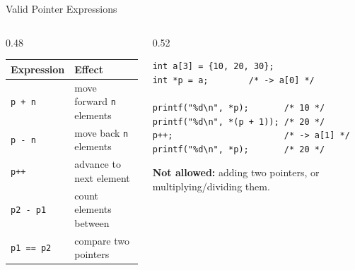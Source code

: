 \documentclass[aspectratio=169]{beamer}
\begin{document}
	\begin{frame}[fragile]{Valid Pointer Expressions}
		\begin{columns}[T]
			\begin{column}{0.48\textwidth}
				\renewcommand{\arraystretch}{1.25}
				\centering
				\begin{tabular}{@{}ll@{}}
					\toprule
					\textbf{Expression} & \textbf{Effect} \\
					\midrule
					\texttt{p + n} & move forward \texttt{n} elements \\
					\texttt{p - n} & move back \texttt{n} elements \\
					\texttt{p++}   & advance to next element \\
					\texttt{p2 - p1} & count elements between \\
					\texttt{p1 == p2} & compare two pointers \\
					\bottomrule
				\end{tabular}
			\end{column}
			\begin{column}{0.52\textwidth}
				\begin{lstlisting}
int a[3] = {10, 20, 30};
int *p = a;        /* -> a[0] */

printf("%d\n", *p);       /* 10 */
printf("%d\n", *(p + 1)); /* 20 */
p++;                      /* -> a[1] */
printf("%d\n", *p);       /* 20 */
				\end{lstlisting}
				\footnotesize \textbf{Not allowed:} adding two pointers, or multiplying/dividing them.
			\end{column}
		\end{columns}
	\end{frame}

\end{document}
